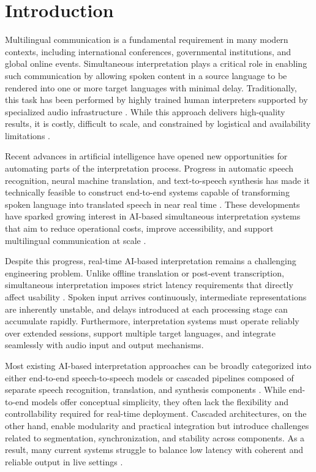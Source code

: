 \chapter{Introduction}
\label{chapter:introduction}

Multilingual communication is a fundamental requirement in many modern contexts, including international conferences, governmental institutions, and global online events. Simultaneous interpretation plays a critical role in enabling such communication by allowing spoken content in a source language to be rendered into one or more target languages with minimal delay. Traditionally, this task has been performed by highly trained human interpreters supported by specialized audio infrastructure \cite{Seeber2015CognitiveLoad}. While this approach delivers high-quality results, it is costly, difficult to scale, and constrained by logistical and availability limitations \cite{dhawan2022speech2speechchallenges, gencheva2023features}.

Recent advances in artificial intelligence have opened new opportunities for automating parts of the interpretation process. Progress in automatic speech recognition, neural machine translation, and text-to-speech synthesis has made it technically feasible to construct end-to-end systems capable of transforming spoken language into translated speech in near real time \cite{popescu-belis2025s2streview}. These developments have sparked growing interest in AI-based simultaneous interpretation systems that aim to reduce operational costs, improve accessibility, and support multilingual communication at scale \cite{ozkaya2023transformative}.

Despite this progress, real-time AI-based interpretation remains a challenging engineering problem. Unlike offline translation or post-event transcription, simultaneous interpretation imposes strict latency requirements that directly affect usability \cite{zheng-etal-2020-fluent}. Spoken input arrives continuously, intermediate representations are inherently unstable, and delays introduced at each processing stage can accumulate rapidly. Furthermore, interpretation systems must operate reliably over extended sessions, support multiple target languages, and integrate seamlessly with audio input and output mechanisms.

Most existing AI-based interpretation approaches can be broadly categorized into either end-to-end speech-to-speech models \cite{jia2022translatotron2} or cascaded pipelines composed of separate speech recognition, translation, and synthesis components \cite{popescu-belis2025s2streview}. While end-to-end models offer conceptual simplicity, they often lack the flexibility and controllability required for real-time deployment. Cascaded architectures, on the other hand, enable modularity and practical integration but introduce challenges related to segmentation, synchronization, and stability across components. As a result, many current systems struggle to balance low latency with coherent and reliable output in live settings \cite{sperber2020endtoendpromise, Sethiya2023EndtoEndSurvey, Etchegoyhen2022CascadeDirectCase}.

